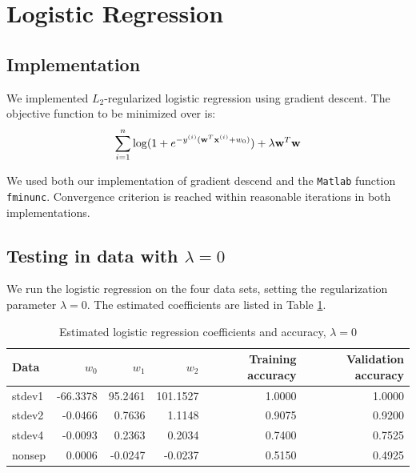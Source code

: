 
\section{Logistic Regression}\label{sec:lr}

\subsection{Implementation}
We implemented $L_2$-regularized logistic regression using gradient descent. The objective function to be minimized over is:
\begin{equation}
\sum_{i=1}^n \log (1 + e^{-y^{(i)}(\boldsymbol{\mathbf{w}}^T\boldsymbol{\mathbf{x}}^{(i)} + w_0)}) + \lambda \boldsymbol{\mathbf{w}}^T\boldsymbol{\mathbf{w}}
\end{equation}

We used both our implementation of gradient descend and the \texttt{Matlab} function \texttt{fminunc}. Convergence criterion is reached within reasonable iterations in both implementations.

\subsection{Testing in data with $\lambda = 0$}
We run the logistic regression on the four data sets, setting the regularization parameter $\lambda = 0$. The estimated coefficients are listed in Table \ref{tab:LR_reg_coeff}.

\begin{table}[h!]
\centering
\caption{Estimated logistic regression coefficients and accuracy, $\lambda = 0$ }
\begin{tabular}{lrrrrr}
  \hline\hline
  Data   & $w_0$ 	& $w_1$ 	  & $w_2$ 	& Training accuracy & Validation accuracy\\
  \hline
  stdev1 & -66.3378  & 95.2461 & 101.1527 & 1.0000    & 1.0000    \\
  stdev2 & -0.0466   & 0.7636  & 1.1148 	& 0.9075    & 0.9200    \\
  stdev4 & -0.0093   & 0.2363  & 0.2034 	& 0.7400    & 0.7525    \\
  nonsep & 0.0006    & -0.0247 & -0.0237	& 0.5150    & 0.4925\\
  \hline\hline
\end{tabular}\label{tab:LR_reg_coeff}
\end{table}

